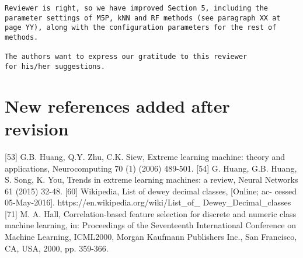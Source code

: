 \documentclass[preprint]{elsarticle}
\begin{document}
\begin{verbatim}
Reviewer is right, so we have improved Section 5, including the 
parameter settings of M5P, kNN and RF methods (see paragraph XX at 
page YY), along with the configuration parameters for the rest of 
methods.

The authors want to express our gratitude to this reviewer 
for his/her suggestions.
\end{verbatim}



\section{New references added after revision}

[53] G.B. Huang, Q.Y. Zhu, C.K. Siew, Extreme learning machine: theory and applications, Neurocomputing 70 (1) (2006) 489-501.
[54] G. Huang, G.B. Huang, S. Song, K. You, Trends in extreme learning machines: a review, Neural Networks 61 (2015) 32-48.
[60] Wikipedia, List of dewey decimal classes, [Online; ac- cessed 05-May-2016]. https://en.wikipedia.org/wiki/List_of_ Dewey_Decimal_classes
[71] M. A. Hall, Correlation-based feature selection for discrete and numeric class machine learning, in: Proceedings of the Seventeenth International Conference on Machine Learning, ICML2000, Morgan Kaufmann Publishers Inc., San Francisco, CA, USA, 2000, pp. 359-366.

\cite{wiki:dewey}
\end{document}
